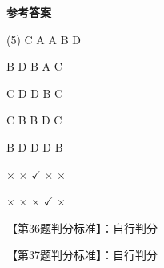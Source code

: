 \documentclass[11pt, a4paper]{article}
\begin{document}
\begin{center}
    \Huge \textbf{参考答案}
\end{center}

    \begin{tasks}[label=\arabic*. , label-width=14pt](5)
        \task C
        \task A
        \task A
        \task B
        \task D

        \task B
        \task D
        \task B
        \task A
        \task C

        \task C
        \task D
        \task D
        \task B
        \task C

        \task C
        \task B
        \task B
        \task D
        \task C

        \task B
        \task D
        \task D
        \task D
        \task B

        \task $\times$
        \task $\times$
        \task $\checkmark$
        \task $\times$
        \task $\times$

        \task $\times$
        \task $\times$
        \task $\times$
        \task $\checkmark$
        \task $\times$
    \end{tasks}

    【第36题判分标准】：自行判分

    【第37题判分标准】：自行判分
\end{document}
